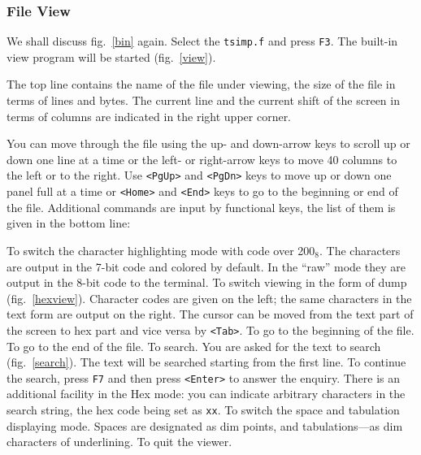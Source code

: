 \subsubsection{File View}

We shall discuss fig.~\ref{bin} again. Select the {\tt tsimp.f} and
press {\tt F3}. The built-in view program will be started (fig.~\ref{view}).
 

The top line contains the name of the file under viewing,
the size of the file in terms of lines and bytes.
The current line and the current shift of the screen
in terms of columns are indicated in the right upper corner.

You can move through the file using the up- and down-arrow
keys to scroll up or down one line at a time or
the left- or right-arrow keys to move 40 columns to the
left or to the right. Use {\tt <PgUp>} and {\tt <PgDn>} keys to
move up or down one panel full at a time or {\tt <Home>}
and {\tt <End>} keys to go to the beginning or end of the file.
Additional commands are input by functional keys, the 
list of them is given in the bottom line:


\begin{example}
To switch the character highlighting mode with code over
200${}_8$. The characters are output in the 7-bit code and colored by default.
In the ``raw'' mode they are output in the 8-bit code to the terminal.
To switch viewing in the form of dump (fig.~\ref{hexview}).
Character codes are given on the left; the same characters in
the text form are output on the right. The cursor can be moved
from the text part of the screen to hex part and vice versa by {\tt <Tab>}.
To go to the beginning of the file.
To go to the end of the file.
To search. You are asked for the text to search (fig.~\ref{search}).
The text will be searched starting from the first line. To continue the search,
press {\tt F7} and then press {\tt <Enter>} to answer the enquiry.
There is an additional facility in the Hex mode: you can indicate arbitrary
characters in the search string, the hex code being set as {\tt \bs xx}.
To switch the space and tabulation displaying mode. Spaces are
designated as dim points, and tabulations---as dim characters of underlining.
To quit the viewer.
\end{example}

